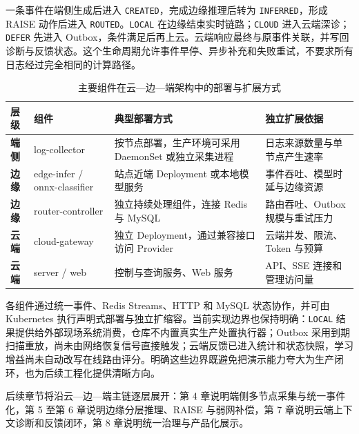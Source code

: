 一条事件在端侧生成后进入 \texttt{CREATED}，完成边缘推理后转为 \texttt{INFERRED}，形成 RAISE 动作后进入 \texttt{ROUTED}。\texttt{LOCAL} 在边缘结束实时链路；\texttt{CLOUD} 进入云端深诊；\texttt{DEFER} 先进入 Outbox，条件满足后再上云。云端响应最终与原事件关联，并写回诊断与反馈状态。这个生命周期允许事件早停、异步补充和失败重试，不要求所有日志经过完全相同的计算路径。

\begin{table}[htbp]
  \centering
  \footnotesize
  \caption{主要组件在云—边—端架构中的部署与扩展方式}
  \label{tab:layered-components}
  \begin{tabularx}{\textwidth}{>{\bfseries}p{} >{\ttfamily}p{} X X}
    \toprule
    层级 & \normalfont\bfseries 组件 & 典型部署方式 & 独立扩展依据 \\
    \midrule
    端侧 & log-collector & 按节点部署，生产环境可采用 DaemonSet 或独立采集进程 & 日志来源数量与单节点产生速率 \\
    边缘 & edge-infer / onnx-classifier & 站点近端 Deployment 或本地模型服务 & 事件吞吐、模型时延与边缘资源 \\
    边缘 & router-controller & 独立持续处理组件，连接 Redis 与 MySQL & 路由吞吐、Outbox 规模与重试压力 \\
    云端 & cloud-gateway & 独立 Deployment，通过兼容接口访问 Provider & 云端并发、限流、Token 与预算 \\
    云端 & server / web & 控制与查询服务、Web 服务 & API、SSE 连接和管理访问量 \\
    \bottomrule
  \end{tabularx}
\end{table}

各组件通过统一事件、Redis Streams、HTTP 和 MySQL 状态协作，并可由 Kubernetes 执行声明式部署与独立扩缩容\cite{kubernetes}。当前实现边界也保持明确：\texttt{LOCAL} 结果提供给外部现场系统消费，仓库不内置真实生产处置执行器；Outbox 采用到期扫描重放，尚未由网络恢复信号直接触发；云端反馈已进入统计和状态快照，学习增益尚未自动改写在线路由评分。明确这些边界既避免把演示能力夸大为生产闭环，也为后续工程化提供清晰方向。

后续章节将沿云—边—端主链逐层展开：第 4 章说明端侧多节点采集与统一事件化，第 5 至第 6 章说明边缘分层推理、RAISE 与弱网补偿，第 7 章说明云端上下文诊断和反馈闭环，第 8 章说明统一治理与产品化展示。
